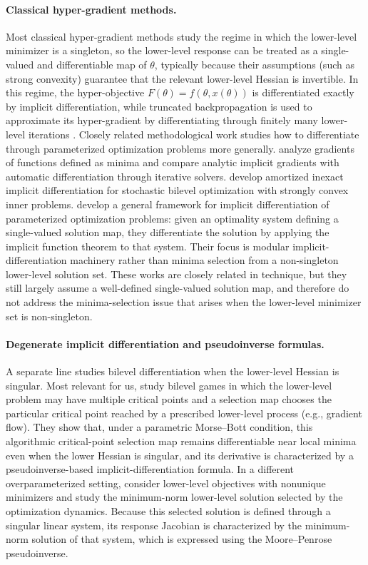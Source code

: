 \documentclass{article}
\theoremstyle{normaltheorem}
\begin{document}
\paragraph{Classical hyper-gradient methods.}
Most classical hyper-gradient methods study the regime in which the lower-level minimizer is a singleton, so the
lower-level response can be treated as a single-valued and differentiable map of \(\theta\), typically because their
assumptions (such as strong convexity) guarantee that the relevant lower-level Hessian is invertible. In this regime, the
hyper-objective \(F(\theta)=f(\theta,x(\theta))\) is differentiated exactly by implicit differentiation, while truncated
backpropagation is used to approximate its hyper-gradient by differentiating through finitely many lower-level iterations
\citep{pedregosa2016hypergrad,franceschi2017forward,lorraine2020optimizing,shaban2019truncated}. Closely
related methodological work studies how to differentiate through parameterized optimization problems more generally.
\citet{ablin2020super} analyze gradients of functions defined as minima and compare analytic implicit gradients with
automatic differentiation through iterative solvers. \citet{arbel2021amortized} develop amortized inexact implicit
differentiation for stochastic bilevel optimization with strongly convex inner problems. \citet{blondel2022efficient} develop a general framework for implicit differentiation of parameterized optimization problems: given an optimality system defining a single-valued solution map, they differentiate the solution by applying the implicit function theorem to that system. Their focus is modular implicit-differentiation machinery rather than minima selection from a non-singleton lower-level solution set.
These works are closely related in technique, but they still largely assume a well-defined single-valued solution map, and therefore do not address the minima-selection issue that arises when the lower-level minimizer set is non-singleton.

\paragraph{Degenerate implicit differentiation and pseudoinverse formulas.}
A separate line studies bilevel differentiation when the lower-level Hessian is singular. Most relevant for us,
\citet{arbel2022non} study bilevel games in which the lower-level problem may have multiple critical points and a
selection map chooses the particular critical point reached by a prescribed lower-level process (e.g., gradient flow).
They show that, under a parametric Morse--Bott condition, this algorithmic critical-point selection map remains
differentiable near local minima even when the lower Hessian is singular, and its derivative is characterized by a
pseudoinverse-based implicit-differentiation formula.
In a different overparameterized setting, \citet{vicol2021implicit,vicol2022implicitbias} consider lower-level objectives
with nonunique minimizers and study the minimum-norm lower-level solution selected by the optimization dynamics. Because
this selected solution is defined through a singular linear system, its response Jacobian is characterized by the
minimum-norm solution of that system, which is expressed using the Moore--Penrose pseudoinverse.
\end{document}
